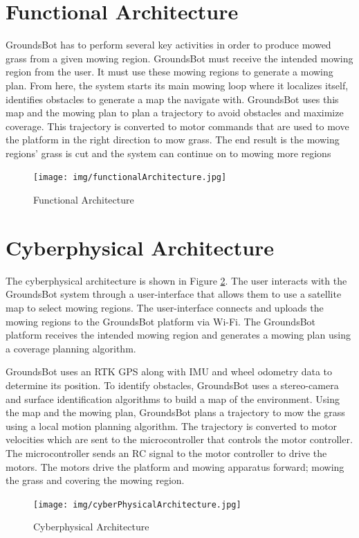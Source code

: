\documentclass[12pt]{extarticle}
\begin{document}
\section{Functional Architecture}
  GroundsBot has to perform several key activities in order to produce mowed grass from a given mowing region.  GroundsBot must receive the intended mowing region from the user.  It must use these mowing regions to generate a mowing plan.  From here, the system starts its main mowing loop where it localizes itself, identifies obstacles to generate a map the navigate with.  GroundsBot uses this map and the mowing plan to plan a trajectory to avoid obstacles and maximize coverage.  This trajectory is converted to motor commands that are used to move the platform in the right direction to mow grass.  The end result is the mowing regions' grass is cut and the system can continue on to mowing more regions\\
  
\begin{figure}[H]
\centering
\def\svgwidth{\columnwidth}
\texttt{[image: img/functionalArchitecture.jpg]}
\caption{Functional Architecture}
\label{fig:functional}
\end{figure}

\newpage
\section{Cyberphysical Architecture}
The cyberphysical architecture is shown in Figure \ref{fig:cyberphysical}.  The user interacts with the GroundsBot system through a user-interface that allows them to use a satellite map to select mowing regions.  The user-interface connects and uploads the mowing regions to the GroundsBot platform via Wi-Fi.  The GroundsBot platform receives the intended mowing region and generates a mowing plan using a coverage planning algorithm.

GroundsBot uses an RTK GPS\cite{swiftnav} along with IMU and wheel odometry data to determine its position.  To identify obstacles, GroundsBot uses a stereo-camera and surface identification algorithms to build a map of the environment.  Using the map and the mowing plan, GroundsBot plans a trajectory to mow the grass using a local motion planning algorithm.  The trajectory is converted to motor velocities which are sent to the microcontroller that controls the motor controller.  The microcontroller sends an RC signal to the motor controller to drive the motors.  The motors drive the platform and mowing apparatus forward; mowing the grass and covering the mowing region.
\begin{figure}[H]
\centering
\def\svgwidth{\columnwidth}
\texttt{[image: img/cyberPhysicalArchitecture.jpg]}
\caption{Cyberphysical Architecture}
\label{fig:cyberphysical}
\end{figure}
  
\end{document}
